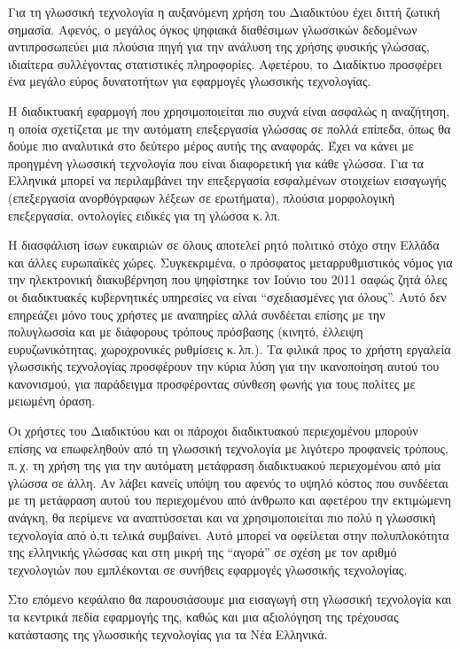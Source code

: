 \documentclass[]{../../metanetpaper}
\begin{document}
\begin{multicols}{2}
Για τη γλωσσική τεχνολογία η αυξανόμενη χρήση του Διαδικτύου έχει διττή ζωτική σημασία. Αφενός, ο μεγάλος όγκος  ψηφιακά διαθέσιμων γλωσσικών δεδομένων αντιπροσωπεύει μια πλούσια πηγή για την ανάλυση της χρήσης φυσικής γλώσσας, ιδιαίτερα συλλέγοντας στατιστικές πληροφορίες. Αφετέρου, το Διαδίκτυο προσφέρει ένα μεγάλο εύρος δυνατοτήτων για εφαρμογές γλωσσικής τεχνολογίας.

Η διαδικτυακή εφαρμογή που χρησιμοποιείται πιο συχνά είναι ασφαλώς η αναζήτηση, η οποία σχετίζεται με την αυτόματη επεξεργασία γλώσσας σε πολλά επίπεδα, όπως θα δούμε πιο αναλυτικά στο δεύτερο μέρος αυτής της αναφοράς. Έχει να κάνει με προηγμένη γλωσσική τεχνολογία που είναι διαφορετική για κάθε γλώσσα. Για τα Ελληνικά μπορεί να περιλαμβάνει την επεξεργασία εσφαλμένων στοιχείων εισαγωγής (επεξεργασία ανορθόγραφων λέξεων σε ερωτήματα), πλούσια μορφολογική επεξεργασία, οντολογίες ειδικές για τη γλώσσα κ.\,λπ.
\columnbreak

Η διασφάλιση ίσων ευκαιριών σε όλους αποτελεί ρητό πολιτικό στόχο στην Ελλάδα και άλλες ευρωπαϊκές χώρες. Συγκεκριμένα, ο πρόσφατος μεταρρυθμιστικός νόμος για την ηλεκτρονική διακυβέρνηση που ψηφίστηκε τον Ιούνιο του 2011 σαφώς ζητά όλες οι διαδικτυακές κυβερνητικές υπηρεσίες να είναι “σχεδιασμένες για όλους”. Αυτό δεν επηρεάζει μόνο τους χρήστες με αναπηρίες αλλά συνδέεται επίσης με την πολυγλωσσία και με διάφορους τρόπους πρόσβασης (κινητό, έλλειψη ευρυζωνικότητας, χωροχρονικές ρυθμίσεις κ.\,λπ.). Τα φιλικά προς το χρήστη εργαλεία γλωσσικής τεχνολογίας προσφέρουν την κύρια λύση για την ικανοποίηση αυτού του κανονισμού, για παράδειγμα προσφέροντας σύνθεση φωνής για τους πολίτες με μειωμένη όραση.

Οι χρήστες του Διαδικτύου και οι πάροχοι διαδικτυακού περιεχομένου μπορούν επίσης να επωφεληθούν από τη γλωσσική τεχνολογία με λιγότερο προφανείς τρόπους, π.\,χ. τη χρήση της για την αυτόματη μετάφραση διαδικτυακού περιεχομένου από μία γλώσσα σε άλλη. Αν λάβει κανείς υπόψη του αφενός το υψηλό κόστος που συνδέεται με τη μετάφραση αυτού του περιεχομένου από  άνθρωπο και αφετέρου την εκτιμώμενη ανάγκη, θα περίμενε να αναπτύσσεται και να χρησιμοποιείται πιο πολύ η γλωσσική τεχνολογία από ό,τι τελικά συμβαίνει. Αυτό μπορεί να οφείλεται στην πολυπλοκότητα της ελληνικής γλώσσας και στη μικρή της “αγορά” σε σχέση με τον αριθμό τεχνολογιών που εμπλέκονται σε συνήθεις εφαρμογές γλωσσικής τεχνολογίας.

Στο επόμενο κεφάλαιο θα παρουσιάσουμε μια εισαγωγή στη γλωσσική τεχνολογία και τα κεντρικά πεδία εφαρμογής της, καθώς και μια αξιολόγηση της τρέχουσας κατάστασης της γλωσσικής τεχνολογίας για τα Νέα Ελληνικά.
\end{multicols}
\end{document}
